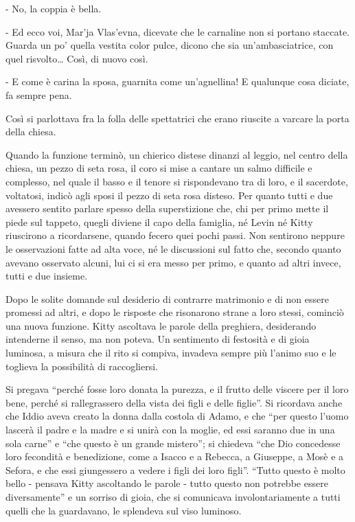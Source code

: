 - No, la coppia è bella. 

- Ed ecco voi, Mar'ja Vlas'evna, dicevate che le carnaline non si portano staccate. Guarda un po' quella vestita color pulce, dicono che sia un'ambasciatrice, con quel risvolto\ldots{} Così, di nuovo così. 

- E come è carina la sposa, guarnita come un'agnellina! E qualunque cosa diciate, fa sempre pena. 

Così si parlottava fra la folla delle spettatrici che erano riuscite a varcare la porta della chiesa. 

Quando la funzione terminò, un chierico distese dinanzi al leggio, nel centro della chiesa, un pezzo di seta rosa, il coro si mise a cantare un salmo difficile e complesso, nel quale il basso e il tenore si rispondevano tra di loro, e il sacerdote, voltatosi, indicò agli sposi il pezzo di seta rosa disteso. Per quanto tutti e due avessero sentito parlare spesso della superstizione che, chi per primo mette il piede sul tappeto, quegli diviene il capo della famiglia, né Levin né Kitty riuscirono a ricordarsene, quando fecero quei pochi passi. Non sentirono neppure le osservazioni fatte ad alta voce, né le discussioni sul fatto che, secondo quanto avevano osservato alcuni, lui ci si era messo per primo, e quanto ad altri invece, tutti e due insieme. 

Dopo le solite domande sul desiderio di contrarre matrimonio e di non essere promessi ad altri, e dopo le risposte che risonarono strane a loro stessi, cominciò una nuova funzione. Kitty ascoltava le parole della preghiera, desiderando intenderne il senso, ma non poteva. Un sentimento di festosità e di gioia luminosa, a misura che il rito si compiva, invadeva sempre più l'animo suo e le toglieva la possibilità di raccogliersi. 

Si pregava ``perché fosse loro donata la purezza, e il frutto delle viscere per il loro bene, perché si rallegrassero della vista dei figli e delle figlie''. Si ricordava anche che Iddio aveva creato la donna dalla costola di Adamo, e che ``per questo l'uomo lascerà il padre e la madre e si unirà con la moglie, ed essi saranno due in una sola carne'' e ``che questo è un grande mistero''; si chiedeva ``che Dio concedesse loro fecondità e benedizione, come a Isacco e a Rebecca, a Giuseppe, a Mosè e a Sefora, e che essi giungessero a vedere i figli dei loro figli''. ``Tutto questo è molto bello - pensava Kitty ascoltando le parole - tutto questo non potrebbe essere diversamente'' e un sorriso di gioia, che si comunicava involontariamente a tutti quelli che la guardavano, le splendeva sul viso luminoso. 

